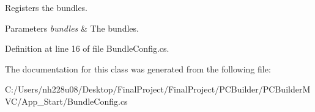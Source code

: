 Registers the bundles. 


\begin{DoxyParams}{Parameters}
{\em bundles} & The bundles.\\
\hline
\end{DoxyParams}


Definition at line 16 of file Bundle\+Config.\+cs.



The documentation for this class was generated from the following file\+:\begin{DoxyCompactItemize}
\item 
C\+:/\+Users/nh228u08/\+Desktop/\+Final\+Project/\+Final\+Project/\+P\+C\+Builder/\+P\+C\+Builder\+M\+V\+C/\+App\+\_\+\+Start/Bundle\+Config.\+cs\end{DoxyCompactItemize}
